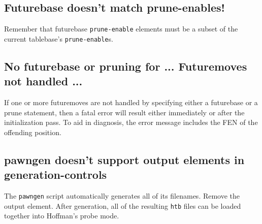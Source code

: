 \documentclass[11pt]{article}
\begin{document}
\subsection{Futurebase doesn't match prune-enables!}

Remember that futurebase {\tt prune-enable} elements must be a
subset of the current tablebase's {\tt prune-enable}s.


\subsection{No futurebase or pruning for ... \hfil\break Futuremoves not handled ...}

If one or more futuremoves are not handled by specifying either a
futurebase or a prune statement, then a fatal error will result either
immediately or after the initialization pass.  To aid in diagnosis,
the error message includes the FEN of the offending position.

\subsection{pawngen doesn't support output elements in generation-controls}

The {\tt pawngen} script automatically generates all of its filenames.
Remove the output element.  After generation, all of the resulting
{\tt htb} files can be loaded together into Hoffman's probe mode.
\end{document}
